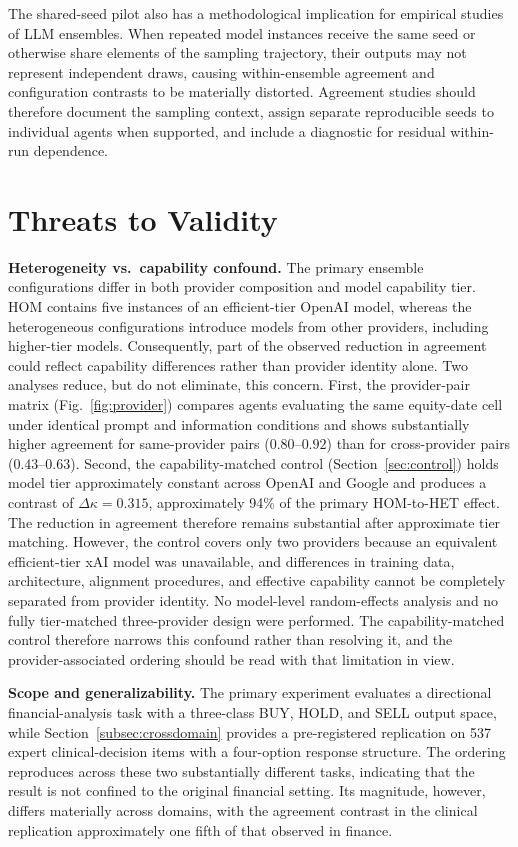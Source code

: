 \documentclass{ieeeaccess}
\begin{document}
The shared-seed pilot also has a methodological implication for empirical
studies of LLM ensembles. When repeated model instances receive the same seed or
otherwise share elements of the sampling trajectory, their outputs may not
represent independent draws, causing within-ensemble agreement and configuration
contrasts to be materially distorted. Agreement studies should therefore
document the sampling context, assign separate reproducible seeds to individual
agents when supported, and include a diagnostic for residual within-run
dependence.

\section{Threats to Validity}
\textbf{Heterogeneity vs.\ capability confound.}
The primary ensemble configurations differ in both provider composition and
model capability tier. HOM contains five instances of an efficient-tier OpenAI
model, whereas the heterogeneous configurations introduce models from other
providers, including higher-tier models. Consequently, part of the observed
reduction in agreement could reflect capability differences rather than provider
identity alone. Two analyses reduce, but do not eliminate, this concern. First,
the provider-pair matrix (Fig.~\ref{fig:provider}) compares agents evaluating
the same equity-date cell under identical prompt and information conditions and
shows substantially higher agreement for same-provider pairs ($0.80$--$0.92$)
than for cross-provider pairs ($0.43$--$0.63$). Second, the capability-matched
control (Section~\ref{sec:control}) holds model tier approximately constant
across OpenAI and Google and produces a contrast of $\Delta\kappa=0.315$,
approximately 94\% of the primary HOM-to-HET effect. The reduction in agreement
therefore remains substantial after approximate tier matching. However, the
control covers only two providers because an equivalent efficient-tier xAI model
was unavailable, and differences in training data, architecture, alignment
procedures, and effective capability cannot be completely separated from
provider identity. No model-level random-effects analysis and no fully
tier-matched three-provider design were performed. The capability-matched
control therefore narrows this confound rather than resolving it, and the
provider-associated ordering should be read with that limitation in view.

\textbf{Scope and generalizability.}
The primary experiment evaluates a directional financial-analysis task with a
three-class BUY, HOLD, and SELL output space, while
Section~\ref{subsec:crossdomain} provides a pre-registered replication on 537
expert clinical-decision items with a four-option response structure. The ordering
reproduces across these two substantially different tasks, indicating that the
result is not confined to the original financial setting. Its magnitude, however,
differs materially across domains, with the agreement contrast in the clinical
replication approximately one fifth of that observed in finance.
\end{document}
